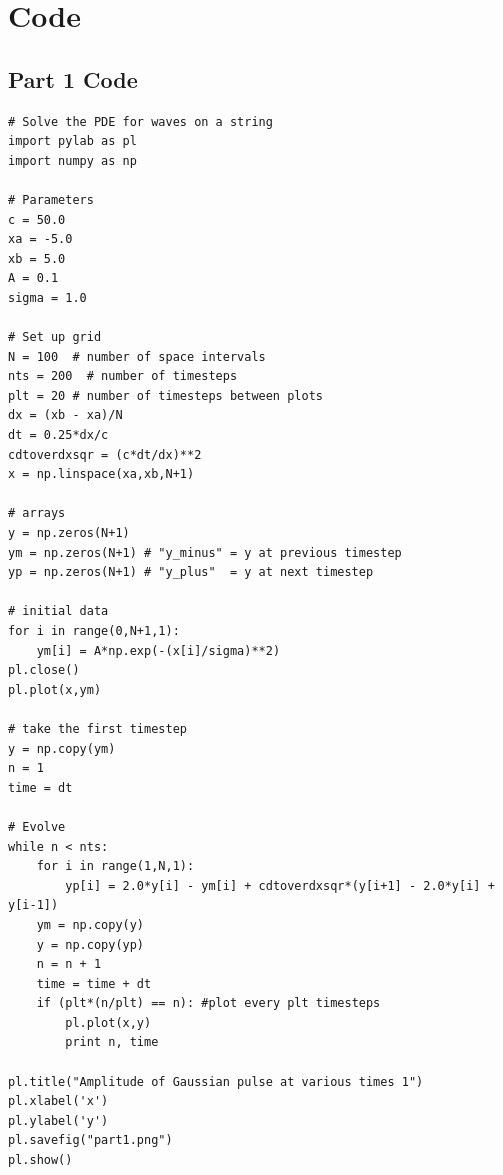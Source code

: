 \documentclass[11pt]{article}
\begin{document}
\section{Code}
\subsection{Part 1 Code}
\begin{verbatim}
# Solve the PDE for waves on a string
import pylab as pl
import numpy as np

# Parameters
c = 50.0
xa = -5.0
xb = 5.0
A = 0.1
sigma = 1.0

# Set up grid
N = 100  # number of space intervals
nts = 200  # number of timesteps
plt = 20 # number of timesteps between plots
dx = (xb - xa)/N
dt = 0.25*dx/c
cdtoverdxsqr = (c*dt/dx)**2
x = np.linspace(xa,xb,N+1)

# arrays
y = np.zeros(N+1)
ym = np.zeros(N+1) # "y_minus" = y at previous timestep
yp = np.zeros(N+1) # "y_plus"  = y at next timestep

# initial data
for i in range(0,N+1,1):
    ym[i] = A*np.exp(-(x[i]/sigma)**2)
pl.close()
pl.plot(x,ym)

# take the first timestep
y = np.copy(ym)
n = 1
time = dt

# Evolve
while n < nts:
    for i in range(1,N,1):
        yp[i] = 2.0*y[i] - ym[i] + cdtoverdxsqr*(y[i+1] - 2.0*y[i] + y[i-1])
    ym = np.copy(y)
    y = np.copy(yp)
    n = n + 1
    time = time + dt
    if (plt*(n/plt) == n): #plot every plt timesteps
        pl.plot(x,y)
        print n, time

pl.title("Amplitude of Gaussian pulse at various times 1")
pl.xlabel('x')
pl.ylabel('y')
pl.savefig("part1.png")
pl.show()

\end{verbatim}
\end{document}
